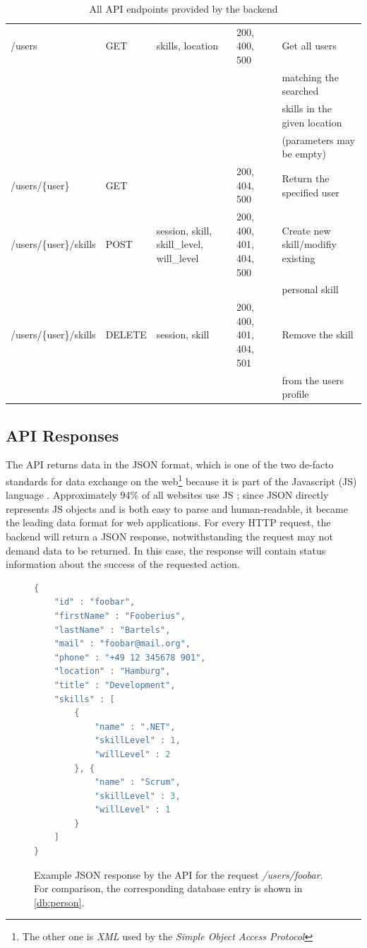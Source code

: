 \begin{table}[p]
{\begin{tabular}{l|l|l|l|l}
  /users               & GET    & skills, location                            & 200, 400, 500           & Get all users\\ & & & &  matching the searched\\ & & & & skills in the given location\\ & & & & (parameters may be empty)\\ \hline
  /users/\{user\}        & GET    &                                             & 200, 404, 500           & Return the specified user\\ \hline
  /users/\{user\}/skills & POST   & session, skill, skill\_level, will\_level & 200, 400, 401, 404, 500 & Create new skill/modifiy existing\\ & & & & personal skill\\ \hline
  /users/\{user\}/skills & DELETE & session, skill                              & 200, 400, 401, 404, 501 & Remove the skill\\ & & & & from the users profile\\
  \end{tabular}
  }
\caption[API Endpoints]{All API endpoints provided by the backend}
\label{swaggertable}
\end{table}
\newpage

\subsection{API Responses}
The API returns data in the JSON format, which is one of the two de-facto standards for data exchange on the web\footnote{The other one is \textit{XML} used by the \textit{Simple Object Access Protocol}} because it is part of the Javascript (JS) language \cite[p. 37]{json}. Approximately 94\% of all websites use JS \cite{jsmarket}; since JSON directly represents JS objects and is both easy to parse and human-readable, it became the leading data format for web applications.
For every HTTP request, the backend will return a JSON response, notwithstanding the request may not demand data to be returned. In this case, the response will contain status information about the success of the requested action.

\begin{figure}[h]
\begin{lstlisting}[language=Java]
{
	"id" : "foobar",
	"firstName" : "Fooberius",
	"lastName" : "Bartels",
	"mail" : "foobar@mail.org",
	"phone" : "+49 12 345678 901",
	"location" : "Hamburg",
	"title" : "Development",
	"skills" : [
		{
			"name" : ".NET",
			"skillLevel" : 1,
			"willLevel" : 2
		}, {
			"name" : "Scrum",
			"skillLevel" : 3,
			"willLevel" : 1
		}
	]
}
\end{lstlisting}
\caption[Person API Response]{Example JSON response by the API for the request \textit{/users/foobar}. For comparison, the corresponding database entry is shown in \ref{db:person}.}
\end{figure}


